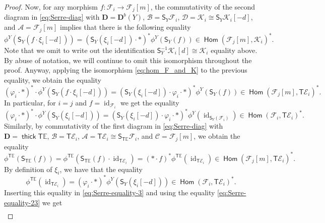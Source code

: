 \documentclass[a4paper,11pt, reqno]{amsart}
\def\E{\mathbb E}
\def\DD{\mathbf D}
\def\sA{\mathscr{A}}
\def\sB{\mathscr{B}}
\def\sC{\mathscr{C}}
\def\sD{\mathscr{D}}
\def\sE{\mathscr{E}}
\def\sF{\mathscr{F}}
\def\sK{\mathscr{K}}
\def\id{{\operatorname{id}}}
\newcommand{\opname}[1]{\operatorname{\mathsf{#1}}}
\newcommand{\Hom}{\opname{Hom}}
\newcommand{\thick}{\opname{thick}\nolimits}
\def\Db{\DD^b}
\newcommand{\bS}{\mathsf{S}}
\newcommand{\bT}{\mathsf{T}}
\theoremstyle{plain}
\theoremstyle{definition}
\numberwithin{equation}{section}
\begin{document}
\begin{proof}
Now, for any morphism $f \colon \sF_i \to \sF_j [m]$, the commutativity of the second diagram in \eqref{eq:Serre-diag} with $\DD = \Db(Y)$, $ \sB = \bS_Y \sF_i $, $\sD = \sK_i \cong \bS_Y \sK_i [-d]$,  and $\sA = \sF_j [m]$
implies  that there is the following equality
\begin{equation}\label{eq:Serre-equality-1}
    \phi^Y ( \bS_Y ( f  \cdot \xi_i [-d] ) ) = ( \bS_Y (\xi_i [-d] ) \cdot \ast  )^\ast \phi^Y( \bS_Y (f ) ) \in \Hom ( \sF_j [m]  , \sK_i  )^\ast .
\end{equation}
Note that we omit to write out the identification $\bS_Y^{-1}\sK_i [d] \cong \sK_i$ equality above.
By abuse of notation, we will continue to omit this isomorphism throughout the proof.
Anyway, applying the isomorphism \eqref{eq:hom_F_and_K} to the previous equality, we obtain the equality
\begin{equation}\label{eq:Serre-equality-2}
    (\varphi_i \cdot \ast )^\ast \cdot \phi^Y ( \bS_Y (f \cdot \xi_i [-d] ) ) = ( \bS_Y (\xi_i [-d] ) \cdot \varphi_i  \cdot \ast  )^\ast \phi^Y( \bS_Y (  f  ) ) \in \Hom ( \sF_j [m]  , \bT \sE_i  )^\ast .
\end{equation}
In particular, for $i = j$ and  $f= \id_{\sF_i }$ we get the equality
\begin{equation}\label{eq:Serre-equality-23}
    (\varphi_i \cdot \ast )^\ast \cdot \phi^Y ( \bS_Y (  \xi_i [-d]) ) = ( \bS_Y (\xi_i [-d]) \cdot \varphi_i  \cdot \ast  )^\ast \phi^Y( \id_{\bS_Y(\sF_i ) } ) \in \Hom ( \sF_i    , \bT \sE_i  )^\ast .
\end{equation}
Similarly, 
by commutativity of the first diagram in \eqref{eq:Serre-diag} with $\DD = \thick \bT \E$, $\sB = \bT \sE_i$, $\sA = \bT\sE_i \cong  \bS_{\bT\E}\sF_i$, and $\sC = \sF_j [m]$,
we obtain the equality
\begin{equation}\label{eq:Serre-equality-3}
    \phi^{\bT\E} ( \bS_{\bT\E}(f)) = \phi^{\bT\E} ( \bS_{\bT\E}(f) \cdot \id_{\bT\sE_i} ) = ( \ast \cdot f)^\ast \phi^{\bT\E} ( \id_{\bT\sE_i} ) \in \Hom ( \sF_j [m]  , \bT\sE_i )^\ast .
\end{equation}
By definition of $\xi_i$, we have that the equality
\begin{equation}\label{eq:id}
    \phi^{\bT\E}(\id_{\bT\sE_i}) = (\varphi_i \cdot \ast )^\ast  \phi^Y (  \bS_Y ( \xi_i [-d] ) ) \in \Hom ( \sF_i   , \bT\sE_i )^\ast .
\end{equation}
Inserting this equality in \eqref{eq:Serre-equality-3} and using the equality \eqref{eq:Serre-equality-23} we get
\begin{align*}

\end{align*}
\end{proof}
\end{document}
